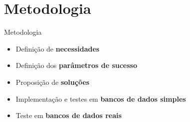 \section[Metodologia]{Metodologia}
\begin{frame}{Metodologia}
\begin{itemize}
	\item Definição de \textbf{necessidades}
	\item Definição dos \textbf{parâmetros de sucesso}
	\item Proposição de \textbf{soluções}
	\item Implementação e testes em \textbf{bancos de dados simples}
	\item Teste em \textbf{bancos de dados reais}
\end{itemize}

\end{frame}
